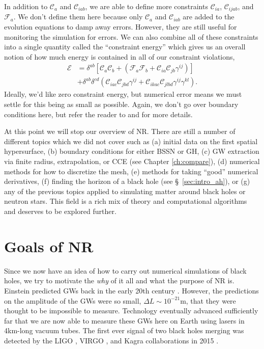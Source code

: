 \begin{bibunit}[unsrtnat]
In addition to $\mathcal{C}_a$ and $\mathcal{C}_{iab}$, we are able to define
more constraints $\mathcal{C}_{ia}$, $\mathcal{C}_{ijab}$, and $\mathcal{F}_a$.
We don't define them here because only $\mathcal{C}_a$ and $\mathcal{C}_{iab}$
are added to the evolution equations to damp away errors. However, they are
still useful for monitoring the simulation for errors. We can also combine all
of these constraints into a single quantity called the ``constraint energy''
which gives us an overall notion of how much energy is contained in all of our
constraint violations,
\begin{align}
  \mathcal{E}
  & = \delta^{ab}\left[ \mathcal{C}_a \mathcal{C}_b
    + \left(\mathcal{F}_a \mathcal{F}_b
    + \mathcal{C}_{ia} \mathcal{C}_{jb} \gamma^{ij}\right)\right]
    \nonumber \\
  &+ \delta^{ab}\delta^{cd}\left(\mathcal{C}_{iac} \mathcal{C}_{jbd}
    \gamma^{ij}
    + \mathcal{C}_{ikac} \mathcal{C}_{jlbd}\gamma^{ij} \gamma^{kl}\right).
\end{align}
Ideally, we'd like zero constraint energy, but numerical error means we must
settle for this being as small as possible. Again, we don't go over boundary
conditions here, but refer the reader to \cite{Lindblom:2005qh} and
\cite{Rinne:2007ui} for more details.

At this point we will stop our overview of NR. There are still
a number of different topics which we did not cover such as (a) initial data on the
first spatial hypersurface, (b) boundary conditions for either BSSN or GH, (c) GW
extraction via finite radius, extrapolation, or CCE (see Chapter
\ref{ch:compare}), (d) numerical methods for how to discretize the mesh, (e)
methods for taking ``good'' numerical derivatives, (f) finding the horizon of a
black hole (see \S~\ref{sec:intro_ah}), or (g) any of the previous topics
applied to simulating matter around black holes or neutron stars. This field is
a rich mix of theory and computational algorithms and deserves to be explored
further.

\section{Goals of NR}
Since we now have an idea of how to carry out numerical simulations of black
holes, we try to motivate the \textit{why} of it all and what the purpose of NR
is. Einstein predicted GWs back in the early 20th century
\cite{Einstein:1916cc,Einstein:1918btx}. However, the predictions on the
amplitude of the GWs were so small, $\Delta L\sim10^{-21}$m, that they were
thought to be impossible to measure. Technology eventually advanced sufficiently
far that we are now able to measure these GWs here on Earth using lasers in
4km-long vacuum tubes. The first ever signal of two black holes merging was detected
by the LIGO \cite{LIGOScientific:2014pky}, VIRGO \cite{VIRGO:2014yos}, and Kagra
\cite{KAGRA:2020tym} collaborations in 2015
\cite{LIGOScientific:2016aoc,KAGRA:2021vkt}.


\end{bibunit}
